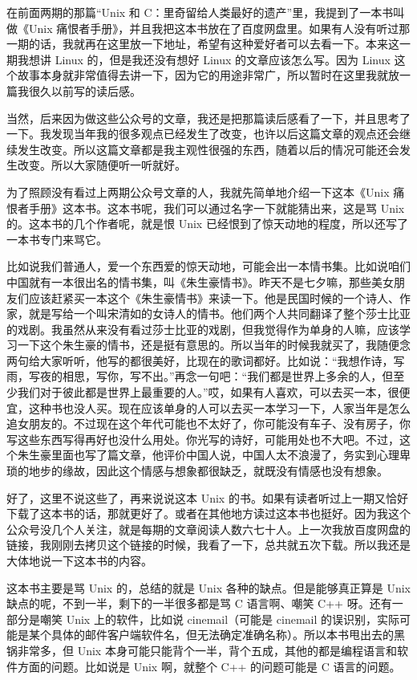 \documentclass[
  letterpaper,
  DIV=11,
  numbers=noendperiod]{scrreprt}
\begin{document}
在前面两期的那篇``Unix 和
C：里奇留给人类最好的遗产''里，我提到了一本书叫做《Unix
痛恨者手册》，并且我把这本书放在了百度网盘里。如果有人没有听过那一期的话，我就再在这里放一下地址，希望有这种爱好者可以去看一下。本来这一期我想讲
Linux 的，但是我还没有想好 Linux 的文章应该怎么写。因为 Linux
这个故事本身就非常值得去讲一下，因为它的用途非常广，所以暂时在这里我就放一篇我很久以前写的读后感。

当然，后来因为做这些公众号的文章，我还是把那篇读后感看了一下，并且思考了一下。我发现当年我的很多观点已经发生了改变，也许以后这篇文章的观点还会继续发生改变。所以这篇文章都是我主观性很强的东西，随着以后的情况可能还会发生改变。所以大家随便听一听就好。

为了照顾没有看过上两期公众号文章的人，我就先简单地介绍一下这本《Unix
痛恨者手册》这本书。这本书呢，我们可以通过名字一下就能猜出来，这是骂
Unix 的。这本书的几个作者呢，就是恨 Unix
已经恨到了惊天动地的程度，所以还写了一本书专门来骂它。

比如说我们普通人，爱一个东西爱的惊天动地，可能会出一本情书集。比如说咱们中国就有一本很出名的情书集，叫《朱生豪情书》。昨天不是七夕嘛，那些美女朋友们应该赶紧买一本这个《朱生豪情书》来读一下。他是民国时候的一个诗人、作家，就是写给一个叫宋清如的女诗人的情书。他们两个人共同翻译了整个莎士比亚的戏剧。我虽然从来没有看过莎士比亚的戏剧，但我觉得作为单身的人嘛，应该学习一下这个朱生豪的情书，还是挺有意思的。所以当年的时候我就买了，我随便念两句给大家听听，他写的都很美好，比现在的歌词都好。比如说：``我想作诗，写雨，写夜的相思，写你，写不出。''再念一句吧：``我们都是世界上多余的人，但至少我们对于彼此都是世界上最重要的人。''哎，如果有人喜欢，可以去买一本，很便宜，这种书也没人买。现在应该单身的人可以去买一本学习一下，人家当年是怎么追女朋友的。不过现在这个年代可能也不太好了，你可能没有车子、没有房子，你写这些东西写得再好也没什么用处。你光写的诗好，可能用处也不大吧。不过，这个朱生豪里面也写了篇文章，他评价中国人说，中国人太不浪漫了，务实到心理卑琐的地步的缘故，因此这个情感与想象都很缺乏，就既没有情感也没有想象。

好了，这里不说这些了，再来说说这本 Unix
的书。如果有读者听过上一期又恰好下载了这本书的话，那就更好了。或者在其他地方读过这本书也挺好。因为我这个公众号没几个人关注，就是每期的文章阅读人数六七十人。上一次我放百度网盘的链接，我刚刚去拷贝这个链接的时候，我看了一下，总共就五次下载。所以我还是大体地说一下这本书的内容。

这本书主要是骂 Unix 的，总结的就是 Unix 各种的缺点。但是能够真正算是
Unix 缺点的呢，不到一半，剩下的一半很多都是骂 C 语言啊、嘲笑 C++
呀。还有一部分是嘲笑 Unix 上的软件，比如说 cinemail（可能是 cinemail
的误识别，实际可能是某个具体的邮件客户端软件名，但无法确定准确名称）。所以本书甩出去的黑锅非常多，但
Unix
本身可能只能背个一半，背个五成，其他的都是编程语言和软件方面的问题。比如说是
Unix 啊，就整个 C++ 的问题可能是 C 语言的问题。
\end{document}
